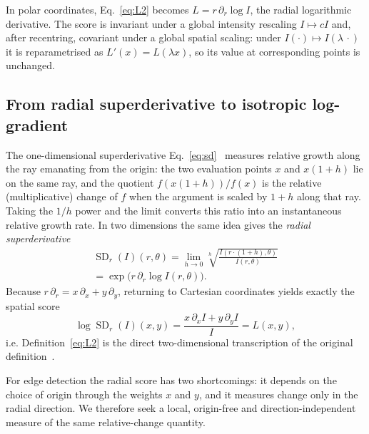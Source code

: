 \documentclass[conference]{IEEEtran}
\DeclareMathOperator{\SD}{SD}
\begin{document}
In polar coordinates, Eq.~\eqref{eq:L2} becomes $L=r\,\partial_r\log I$, the
radial logarithmic derivative.  The score is invariant under a global
intensity rescaling $I\mapsto cI$ and, after recentring, covariant under a
global spatial scaling: under $I(\cdot)\mapsto I(\lambda\,\cdot)$ it is
reparametrised as $L'(x)=L(\lambda x)$, so its value at corresponding
points is unchanged.

\subsection{From radial superderivative to isotropic log-gradient}
\label{sec:synthesis}
The one-dimensional superderivative Eq.~\eqref{eq:sd}~\cite{zotkin,grossman} measures relative growth
along the ray emanating from the origin: the two evaluation points $x$ and
$x(1+h)$ lie on the same ray, and the quotient $f(x(1+h))/f(x)$ is the relative
(multiplicative) change of $f$ when the argument is scaled by $1+h$ along that
ray.  Taking the $1/h$ power and the limit converts this ratio into an
instantaneous relative growth rate.  In two dimensions the same idea
gives the \emph{radial superderivative}
\begin{multline}
\SD_r(I)(r,\theta)
= \lim_{h\to0} \sqrt[h]{\frac{I(r\cdot(1+h),\theta)}{I(r,\theta)}} \\
= \exp\!\big(r\,\partial_r\log I(r,\theta)\big).
\label{eq:sdradial}
\end{multline}
Because $r\,\partial_r = x\,\partial_x + y\,\partial_y$, returning to
Cartesian coordinates yields exactly the spatial score
\begin{equation}
\log \SD_r(I)(x,y)
= \frac{x\,\partial_x I + y\,\partial_y I}{I}
= L(x,y),
\label{eq:Lcartesian}
\end{equation}
i.e. Definition~\eqref{eq:L2} is the direct two-dimensional transcription of
the original definition~\cite{zotkin,grossman}.

For edge detection the radial score has two shortcomings: it depends on the
choice of origin through the weights $x$ and $y$, and it measures change only
in the radial direction.  We therefore seek a local, origin-free and
direction-independent measure of the same relative-change quantity.
\end{document}
